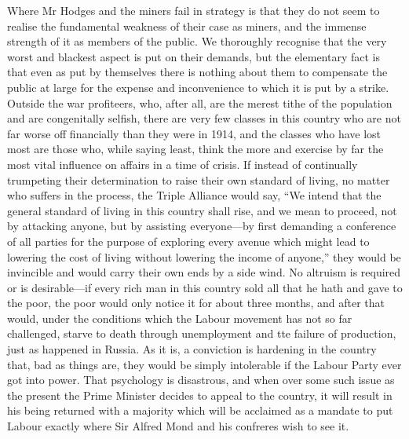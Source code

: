 \documentclass{book}
\begin{document}
Where Mr Hodges and the miners fail in strategy is that they do not seem to realise the fundamental weakness of their case as miners, and the immense strength of it as members of the public. We thoroughly recognise that the very worst and blackest aspect is put on their demands, but the elementary fact is that even as put by themselves there is nothing about them to compensate the public at large for the expense and inconvenience to which it is put by a strike. Outside the war profiteers, who, after all, are the merest tithe of the population and are congenitally selfish, there are very few classes in this country who are not far worse off financially than they were in 1914, and the classes who have lost most are those who, while saying least, think the more and exercise by far the most vital influence on affairs in a time of crisis. If instead of continually trumpeting their determination to raise their own standard of living, no matter who suffers in the process, the Triple Alliance would say, “We intend that the general standard of living in this country shall rise, and we mean to proceed, not by attacking anyone, but by assisting everyone—by first demanding a conference of all parties for the purpose of exploring every avenue which might lead to lowering the cost of living without lowering the income of anyone,” they would be invincible and would carry their own ends by a side wind. No altruism is required or is desirable—if every rich man in this country sold all that he hath and gave to the poor, the poor would only notice it for about three months, and after that would, under the conditions which the Labour movement has not so far challenged, starve to death through unemployment and tte failure of production, just as happened in Russia. As it is, a conviction is hardening in the country that, bad as things are, they would be simply intolerable if the Labour Party ever got into power. That psychology is disastrous, and when over some such issue as the present the Prime Minister decides to appeal to the country, it will result in his being returned with a majority which will be acclaimed as a mandate to put Labour exactly where Sir Alfred Mond and his confreres wish to see it.
\end{document}
